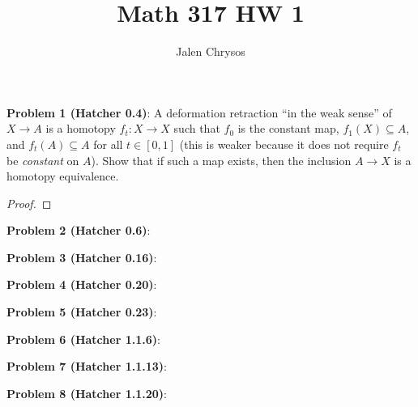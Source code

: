 \documentclass{amsart}
\title{Math 317 HW 1}
\author{Jalen Chrysos}
\begin{document}
	
	\maketitle

\noindent \textbf{Problem 1 (Hatcher 0.4)}: A deformation retraction ``in the weak sense'' of $X\to A$ is a homotopy $f_t:X\to X$ such that $f_0$ is the constant map, $f_1(X)\subseteq A$, and $f_t(A)\subseteq A$ for all $t\in [0,1]$ (this is weaker because it does not require $f_t$ be \textit{constant} on $A$). Show that if such a map exists, then the inclusion $A\to X$ is a homotopy equivalence.

\begin{proof}
	
\end{proof}

\newpage 


\noindent \textbf{Problem 2 (Hatcher 0.6)}:

\newpage 


\noindent \textbf{Problem 3 (Hatcher 0.16)}:

\newpage 


\noindent \textbf{Problem 4 (Hatcher 0.20)}:

\newpage 


\noindent \textbf{Problem 5 (Hatcher 0.23)}:

\newpage 


\noindent \textbf{Problem 6 (Hatcher 1.1.6)}:

\newpage 


\noindent \textbf{Problem 7 (Hatcher 1.1.13)}:

\newpage 


\noindent \textbf{Problem 8 (Hatcher 1.1.20)}:
\end{document}

